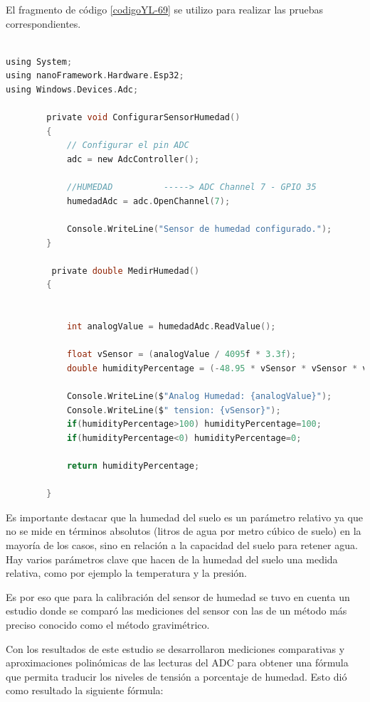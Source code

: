 El fragmento de código \ref{codigoYL-69} se utilizo para realizar las pruebas correspondientes.

\begin{lstlisting}[language=C, label=codigoYL-69, caption= Fragmento del código del sensor de humedad YL-69]

using System;
using nanoFramework.Hardware.Esp32;
using Windows.Devices.Adc;

        private void ConfigurarSensorHumedad()
        {
            // Configurar el pin ADC
            adc = new AdcController();

            //HUMEDAD          -----> ADC Channel 7 - GPIO 35 
            humedadAdc = adc.OpenChannel(7);

            Console.WriteLine("Sensor de humedad configurado.");
        }

         private double MedirHumedad()
        {
            
            
            int analogValue = humedadAdc.ReadValue();

            float vSensor = (analogValue / 4095f * 3.3f);
            double humidityPercentage = (-48.95 * vSensor * vSensor * vSensor) + (368.10 * vSensor * vSensor) - 910.85 * vSensor + 757.17;

            Console.WriteLine($"Analog Humedad: {analogValue}");
            Console.WriteLine($" tension: {vSensor}");
            if(humidityPercentage>100) humidityPercentage=100;
            if(humidityPercentage<0) humidityPercentage=0;

            return humidityPercentage;

        }
\end{lstlisting}

Es importante destacar que la humedad del suelo es un parámetro relativo ya que no se mide en términos absolutos (litros de agua por metro cúbico de suelo) en la mayoría de los casos, sino en relación a la capacidad del suelo para retener agua. Hay varios parámetros clave que hacen de la humedad del suelo una medida relativa, como por ejemplo la temperatura y la presión.

Es por eso que para la calibración del sensor de humedad se tuvo en cuenta un estudio\cite{yl_69_calibration} donde se comparó las mediciones del sensor con las de un método más preciso conocido como el método gravimétrico.

Con los resultados de este estudio se desarrollaron mediciones comparativas y aproximaciones polinómicas de las lecturas del ADC para obtener una fórmula que permita traducir los niveles de tensión a porcentaje de humedad. Esto dió como resultado la siguiente fórmula:

